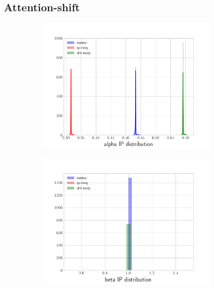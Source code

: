   
\subsection*{Attention-shift}
\begin{figure}[!h]
\centering
\begin{subfigure}{.5\textwidth}
  \centering
  \includegraphics[width=\linewidth]{figures/alpha-distrib-high-cap}
\end{subfigure}%
\begin{subfigure}{.5\textwidth}
  \centering
  \includegraphics[width=\linewidth]{figures/beta-distrib-high-cap}
\end{subfigure}
\end{figure}

